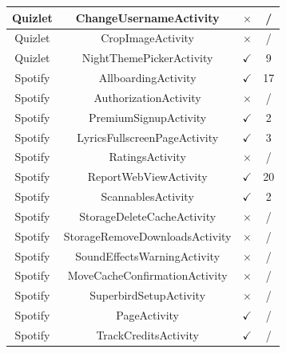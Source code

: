 \documentclass[conference]{IEEEtran}
\begin{document}
\begin{table}
\begin{tabular}{|c|c|c|c|}
    Quizlet           & ChangeUsernameActivity             & $\times$           & /              \\ \hline
    Quizlet           & CropImageActivity                  & $\times$           & /              \\ \hline
    Quizlet           & NightThemePickerActivity           & $\checkmark$       & 9              \\ \hline
    Spotify           & AllboardingActivity                & $\checkmark$       & 17             \\ \hline
    Spotify           & AuthorizationActivity              & $\times$           & /              \\ \hline
    Spotify           & PremiumSignupActivity              & $\checkmark$       & 2              \\ \hline
    Spotify           & LyricsFullscreenPageActivity       & $\checkmark$       & 3              \\ \hline
    Spotify           & RatingsActivity                    & $\times$           & /              \\ \hline
    Spotify           & ReportWebViewActivity              & $\checkmark$       & 20             \\ \hline
    Spotify           & ScannablesActivity                 & $\checkmark$       & 2              \\ \hline
    Spotify           & StorageDeleteCacheActivity         & $\times$           & /              \\ \hline
    Spotify           & StorageRemoveDownloadsActivity     & $\times$           & /              \\ \hline
    Spotify           & SoundEffectsWarningActivity        & $\times$           & /              \\ \hline
    Spotify           & MoveCacheConfirmationActivity      & $\times$           & /              \\ \hline
    Spotify           & SuperbirdSetupActivity             & $\times$           & /              \\ \hline
    Spotify           & PageActivity                       & $\checkmark$       & /              \\ \hline
    Spotify           & TrackCreditsActivity               & $\checkmark$       & /              \\ \hline
    \end{tabular}
    \end{table}
\end{document}
